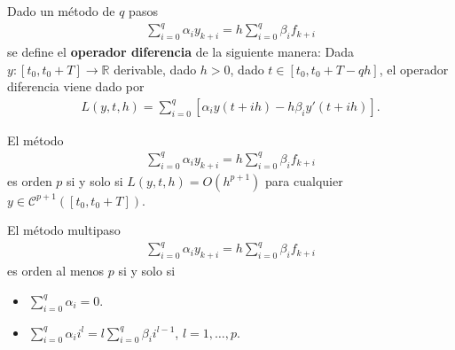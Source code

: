 \begin{defi}
Dado un método de $q$ pasos
\begin{align*}
    \sum_{i=0}^{q} \alpha_i y_{k+i} = h\sum_{i=0}^{q} \beta_i f_{k+i}
\end{align*}
se define el \textbf{operador diferencia} de la siguiente manera: Dada $y:[t_0,t_0+T] \longrightarrow \mathbb{R}$ derivable, dado $h>0$, dado $t \in [t_0,t_0+T-qh]$, el operador diferencia viene dado por
\begin{align*}
    L(y,t,h) = \sum_{i=0}^{q}[\alpha_i y(t+ih) - h\beta_i y'(t+ih)].
\end{align*}
\end{defi}

\begin{teo}
El método
\begin{align*}
    \sum_{i=0}^{q} \alpha_i y_{k+i} = h\sum_{i=0}^{q} \beta_i f_{k+i}
\end{align*}
es orden $p$ si y solo si $L(y,t,h) = O(h^{p+1})$ para cualquier $y \in \mathscr{C}^{p+1}([t_0,t_0+T])$.
\end{teo}

\begin{teo}
El método multipaso
\begin{align*}
    \sum_{i=0}^{q} \alpha_i y_{k+i} = h\sum_{i=0}^{q} \beta_i f_{k+i}
\end{align*}
es orden al menos $p$ si y solo si
\begin{itemize}
    \item $\sum_{i=0}^{q} \alpha_i = 0$.
    \item $\sum_{i=0}^{q} \alpha_i i^l = l\sum_{i=0}^{q} \beta_i i^{l-1}$, $l = 1,\ldots,p$.
\end{itemize}
\end{teo}

